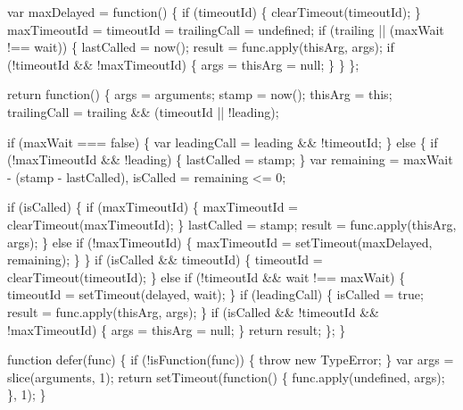 \begin{DoxyCodeInclude}
      var maxDelayed = \textcolor{keyword}{function}() \{
        \textcolor{keywordflow}{if} (timeoutId) \{
          clearTimeout(timeoutId);
        \}
        maxTimeoutId = timeoutId = trailingCall = undefined;
        \textcolor{keywordflow}{if} (trailing || (maxWait !== wait)) \{
          lastCalled = now();
          result = func.apply(thisArg, args);
          \textcolor{keywordflow}{if} (!timeoutId && !maxTimeoutId) \{
            args = thisArg = null;
          \}
        \}
      \};

      \textcolor{keywordflow}{return} \textcolor{keyword}{function}() \{
        args = arguments;
        stamp = now();
        thisArg = \textcolor{keyword}{this};
        trailingCall = trailing && (timeoutId || !leading);

        \textcolor{keywordflow}{if} (maxWait === \textcolor{keyword}{false}) \{
          var leadingCall = leading && !timeoutId;
        \} \textcolor{keywordflow}{else} \{
          \textcolor{keywordflow}{if} (!maxTimeoutId && !leading) \{
            lastCalled = stamp;
          \}
          var remaining = maxWait - (stamp - lastCalled),
              isCalled = remaining <= 0;

          \textcolor{keywordflow}{if} (isCalled) \{
            \textcolor{keywordflow}{if} (maxTimeoutId) \{
              maxTimeoutId = clearTimeout(maxTimeoutId);
            \}
            lastCalled = stamp;
            result = func.apply(thisArg, args);
          \}
          \textcolor{keywordflow}{else} \textcolor{keywordflow}{if} (!maxTimeoutId) \{
            maxTimeoutId = setTimeout(maxDelayed, remaining);
          \}
        \}
        \textcolor{keywordflow}{if} (isCalled && timeoutId) \{
          timeoutId = clearTimeout(timeoutId);
        \}
        \textcolor{keywordflow}{else} \textcolor{keywordflow}{if} (!timeoutId && wait !== maxWait) \{
          timeoutId = setTimeout(delayed, wait);
        \}
        \textcolor{keywordflow}{if} (leadingCall) \{
          isCalled = \textcolor{keyword}{true};
          result = func.apply(thisArg, args);
        \}
        \textcolor{keywordflow}{if} (isCalled && !timeoutId && !maxTimeoutId) \{
          args = thisArg = null;
        \}
        \textcolor{keywordflow}{return} result;
      \};
    \}

    \textcolor{keyword}{function} defer(func) \{
      \textcolor{keywordflow}{if} (!isFunction(func)) \{
        \textcolor{keywordflow}{throw} \textcolor{keyword}{new} TypeError;
      \}
      var args = slice(arguments, 1);
      \textcolor{keywordflow}{return} setTimeout(\textcolor{keyword}{function}() \{ func.apply(undefined, args); \}, 1);
    \}


\end{DoxyCodeInclude}

